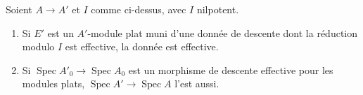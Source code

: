\begin{encadre}
\begin{theoreme}\label{thm:128-descente}
Soient $A \to A'$ et $I$ comme ci-dessus, avec $I$ nilpotent.
\begin{enumerate}
\item Si $E'$ est un $A'$-module plat muni d'une donnée de descente dont la réduction modulo $I$ est effective, la donnée est effective.
\item Si $\operatorname{Spec} A'_0 \to \operatorname{Spec} A_0$ est un morphisme de descente effective pour les modules plats, $\operatorname{Spec} A' \to \operatorname{Spec} A$ l'est aussi.
\end{enumerate}
\end{theoreme}
\end{encadre}

